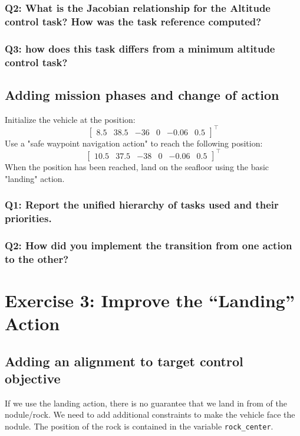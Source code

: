 \documentclass{article}
\begin{document}
\subsubsection{Q2: What is the Jacobian relationship for the Altitude control task? How was the task reference computed?}

\subsubsection{Q3: how does this task differs from a minimum altitude control task?}

\subsection{Adding mission phases and change of action}
Initialize the vehicle at the position:
\begin{displaymath}
\begin{bmatrix} 8.5 & 38.5 & -36 & 0 & -0.06 & 0.5 \end{bmatrix}^\top
\end{displaymath}
Use a "safe waypoint navigation action" to reach the following position:
\begin{displaymath}
\begin{bmatrix} 10.5 & 37.5 & -38 & 0 & -0.06 & 0.5 \end{bmatrix}^\top
\end{displaymath}
When the position has been reached, land on the seafloor using the basic "landing" action.

\subsubsection{Q1: Report the unified hierarchy of tasks used and their priorities.}

\subsubsection{Q2: How did you implement the transition from one action to the other?}

\clearpage

\section{Exercise 3: Improve the “Landing” Action}
\subsection{Adding an alignment to target control objective}
If we use the landing action, there is no guarantee that we land in from of the nodule/rock. We need to add additional constraints to make the vehicle face the nodule. The position of the rock is contained in the variable \texttt{rock\_center}.
\end{document}
